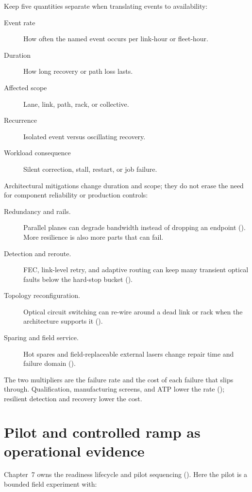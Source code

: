 Keep five quantities separate when translating events to availability:

\begin{description}
\item[Event rate] How often the named event occurs per link-hour or fleet-hour.
\item[Duration] How long recovery or path loss lasts.
\item[Affected scope] Lane, link, path, rack, or collective.
\item[Recurrence] Isolated event versus oscillating recovery.
\item[Workload consequence] Silent correction, stall, restart, or job failure.
\end{description}

Architectural mitigations change duration and scope; they do not erase the need
for component reliability or production controls:

\begin{description}
\item[Redundancy and rails.] Parallel planes can degrade bandwidth instead of
      dropping an endpoint (). More resilience is also more
      parts that can fail.
\item[Detection and reroute.] FEC, link-level retry, and adaptive routing can
      keep many transient optical faults below the hard-stop bucket
      ().
\item[Topology reconfiguration.] Optical circuit switching can re-wire around a
      dead link or rack when the architecture supports it ().
\item[Sparing and field service.] Hot spares and field-replaceable external
      lasers change repair time and failure domain ().
\end{description}

The two multipliers are the failure rate and the cost of each failure that
slips through. Qualification, manufacturing screens, and ATP lower the rate
(); resilient detection and recovery
lower the cost.

\section{Pilot and controlled ramp as operational evidence}
\label{sec:ops-pilot-evidence}

Chapter~7 owns the readiness lifecycle and pilot sequencing
(). Here the pilot is a bounded
field experiment with:

